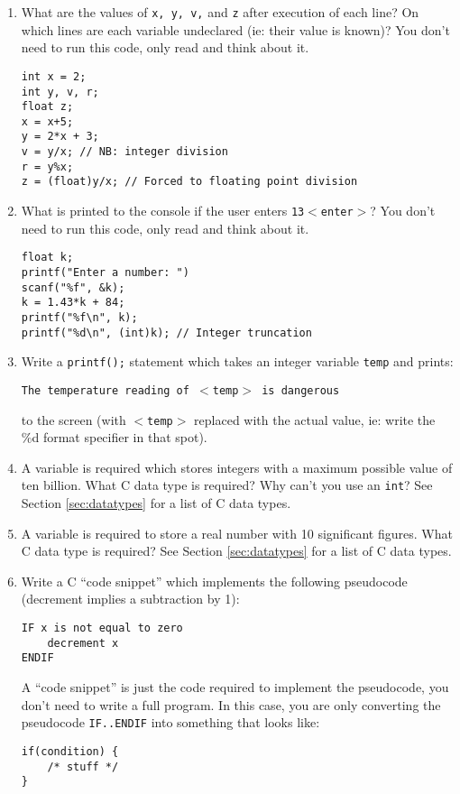 \documentclass{lab}
\begin{document}
\begin{enumerate}
\item What are the values of \texttt{x, y, v,} and \texttt{z} after execution of each line? On which lines are each variable undeclared (ie: their value is known)? You don't need to run this code, only read and think about it.
\begin{lstlisting}[style=CStyle]
int x = 2;
int y, v, r;
float z;
x = x+5;
y = 2*x + 3;
v = y/x; // NB: integer division
r = y%x;
z = (float)y/x; // Forced to floating point division
\end{lstlisting}
\item What is printed to the console if the user enters \texttt{13$<$enter$>$}? You don't need to run this code, only read and think about it.
\begin{lstlisting}[style=CStyle]
float k;
printf("Enter a number: ")
scanf("%f", &k);
k = 1.43*k + 84;
printf("%f\n", k);
printf("%d\n", (int)k); // Integer truncation
\end{lstlisting}
\item Write a \texttt{printf();} statement which takes an integer variable \texttt{temp} and prints:

\texttt{The temperature reading of $<$temp$>$ is dangerous}

to the screen (with \texttt{$<$temp$>$} replaced with the actual value, ie: write the \%d format specifier in that spot).
\item A variable is required which stores integers with a maximum possible value of ten billion. What C data type is required? Why can't you use an \texttt{int}? See Section \ref{sec:datatypes} for a list of C data types.
\item A variable is required to store a real number with 10 significant figures. What C data type is required? See Section \ref{sec:datatypes} for a list of C data types.
\item Write a C ``code snippet'' which implements the following pseudocode (decrement implies a subtraction by 1):
\begin{lstlisting}[style=pseudo]
IF x is not equal to zero
	decrement x
ENDIF
\end{lstlisting}

A ``code snippet'' is just the code required to implement the pseudocode, you don't need to write a full program. In this case, you are only converting the pseudocode \texttt{IF..ENDIF} into something that looks like:

\begin{lstlisting}[style=CStyle]
if(condition) {
	/* stuff */ 
}
\end{lstlisting}
 

\end{enumerate}
\end{document}
